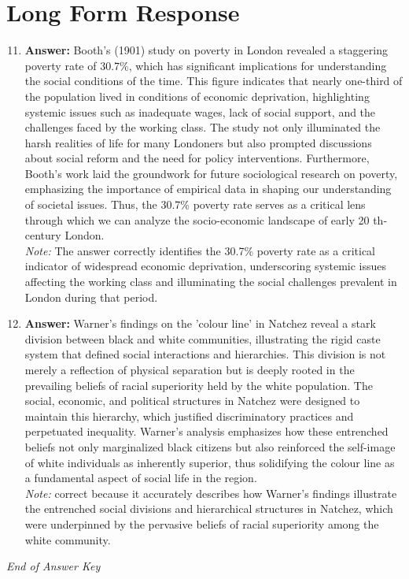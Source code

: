 \documentclass[12pt]{article}
\begin{document}
\section*{Long Form Response}
\begin{enumerate}[label=\arabic*.]
\setcounter{enumi}{10}
\item \textbf{Answer:} Booth's (1901) study on poverty in London revealed a staggering poverty rate of 30.7\%, which has significant implications for understanding the social conditions of the time. This figure indicates that nearly one-third of the population lived in conditions of economic deprivation, highlighting systemic issues such as inadequate wages, lack of social support, and the challenges faced by the working class. The study not only illuminated the harsh realities of life for many Londoners but also prompted discussions about social reform and the need for policy interventions. Furthermore, Booth's work laid the groundwork for future sociological research on poverty, emphasizing the importance of empirical data in shaping our understanding of societal issues. Thus, the 30.7\% poverty rate serves as a critical lens through which we can analyze the socio-economic landscape of early 20 th-century London.
\\ \textit{Note:} The answer correctly identifies the 30.7\% poverty rate as a critical indicator of widespread economic deprivation, underscoring systemic issues affecting the working class and illuminating the social challenges prevalent in London during that period.
\item \textbf{Answer:} Warner's findings on the 'colour line' in Natchez reveal a stark division between black and white communities, illustrating the rigid caste system that defined social interactions and hierarchies. This division is not merely a reflection of physical separation but is deeply rooted in the prevailing beliefs of racial superiority held by the white population. The social, economic, and political structures in Natchez were designed to maintain this hierarchy, which justified discriminatory practices and perpetuated inequality. Warner's analysis emphasizes how these entrenched beliefs not only marginalized black citizens but also reinforced the self-image of white individuals as inherently superior, thus solidifying the colour line as a fundamental aspect of social life in the region.
\\ \textit{Note:} correct because it accurately describes how Warner's findings illustrate the entrenched social divisions and hierarchical structures in Natchez, which were underpinned by the pervasive beliefs of racial superiority among the white community.
\end{enumerate}

\vfill
\noindent\textit{End of Answer Key}
\end{document}

